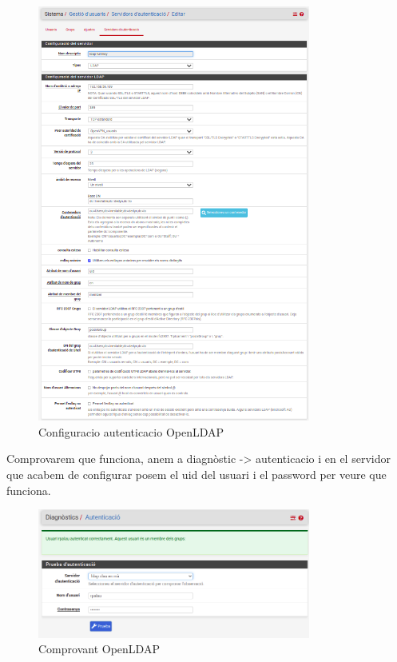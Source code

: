 \documentclass[
  10pt,
]{krantz}
\begin{document}
\begin{figure}
\centering
\includegraphics[width=0.8\textwidth,height=\textheight]{imatges/proxmox/pfSense_conf_LDAP_aut.png}
\caption{Configuracio autenticacio OpenLDAP}
\end{figure}

Comprovarem que funciona, anem a diagnòstic -\textgreater{} autenticacio i en el servidor que acabem de configurar posem el uid del usuari i el password per veure que funciona.

\begin{figure}
\centering
\includegraphics[width=0.8\textwidth,height=\textheight]{imatges/proxmox/Comprova_aut_ldap.png}
\caption{Comprovant OpenLDAP}
\end{figure}
\end{document}
